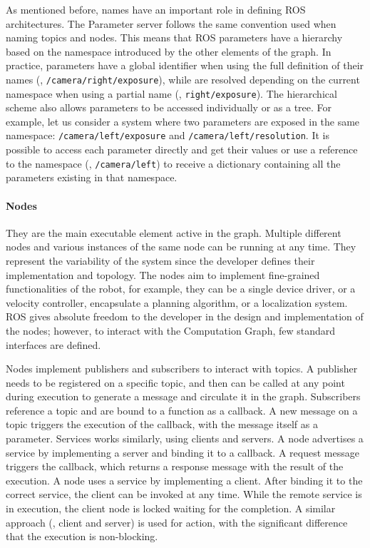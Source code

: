 As mentioned before, names have an important role in defining ROS architectures. The Parameter server follows the same convention used when naming topics and nodes. This means that ROS parameters have a hierarchy based on the namespace introduced by the other elements of the graph. In practice, parameters have a global identifier when using the full definition of their names (\eg, \texttt{/camera/right/exposure}), while are resolved depending on the current namespace when using a partial name (\eg, \texttt{right/exposure}). The hierarchical scheme also allows parameters to be accessed individually or as a tree. For example, let us consider a system where two parameters are exposed in the same namespace: \texttt{/camera/left/exposure} and \texttt{/camera/left/resolution}. It is possible to access each parameter directly and get their values or use a reference to the namespace (\ie, \texttt{/camera/left}) to receive a dictionary containing all the parameters existing in that namespace.

\paragraph{Nodes} They are the main executable element active in the graph. Multiple different nodes and various instances of the same node can be running at any time. They represent the variability of the system since the developer defines their implementation and topology. The nodes aim to implement fine-grained functionalities of the robot, for example, they can be a single device driver, or a velocity controller, encapsulate a planning algorithm, or a localization system. ROS gives absolute freedom to the developer in the design and implementation of the nodes; however, to interact with the Computation Graph, few standard interfaces are defined.

Nodes implement publishers and subscribers to interact with topics. A publisher needs to be registered on a specific topic, and then can be called at any point during execution to generate a message and circulate it in the graph. Subscribers reference a topic and are bound to a function as a callback. A new message on a topic triggers the execution of the callback, with the message itself as a parameter. Services works similarly, using clients and servers. A node advertises a service by implementing a server and binding it to a callback. A request message triggers the callback, which returns a response message with the result of the execution. A node uses a service by implementing a client. After binding it to the correct service, the client can be invoked at any time. While the remote service is in execution, the client node is locked waiting for the completion. A similar approach (\ie, client and server) is used for action, with the significant difference that the execution is non-blocking.

